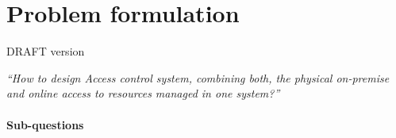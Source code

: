 \section{Problem formulation} \label{problemFormulation}

DRAFT version

\textit{“How to design Access control system, combining both, the physical on-premise and online access to resources managed in one system?”}

\paragraph{Sub-questions}
